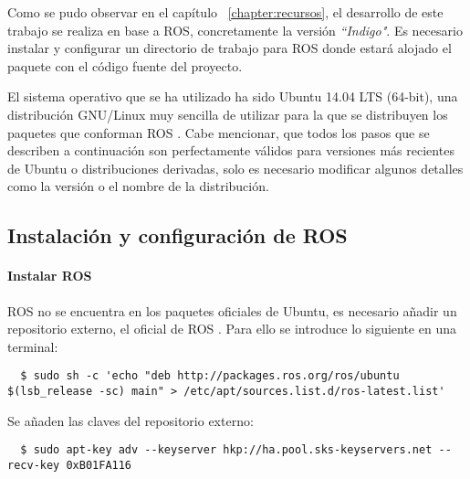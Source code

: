 

Como se pudo observar en el capítulo ~\ref{chapter:recursos}, el desarrollo de
este trabajo se realiza en base a ROS, concretamente la versión
\textit{``Indigo"}. Es necesario instalar y configurar un directorio de trabajo
para ROS donde estará alojado el paquete con el código fuente del proyecto.

El sistema operativo que se ha utilizado ha sido Ubuntu 14.04 LTS (64-bit), una
distribución GNU/Linux muy sencilla de utilizar para la que se distribuyen los
paquetes que conforman ROS \cite{Ubuntu}. Cabe mencionar, que todos los pasos
que se describen a continuación son perfectamente válidos para versiones más
recientes de Ubuntu o distribuciones derivadas, solo es necesario modificar
algunos detalles como la versión o el nombre de la distribución. 

\subsection{Instalación y configuración de ROS}

\paragraph{Instalar ROS} \hspace{0pt}

ROS no se encuentra en los paquetes oficiales de Ubuntu, es necesario añadir un
repositorio externo, el oficial de ROS \cite{ROSInstall}. Para ello se introduce
lo siguiente en una terminal:
\\
\begin{lstlisting}
  $ sudo sh -c 'echo "deb http://packages.ros.org/ros/ubuntu $(lsb_release -sc) main" > /etc/apt/sources.list.d/ros-latest.list'
\end{lstlisting}

Se añaden las claves del repositorio externo:
\\
\begin{lstlisting}
  $ sudo apt-key adv --keyserver hkp://ha.pool.sks-keyservers.net --recv-key 0xB01FA116
\end{lstlisting}

